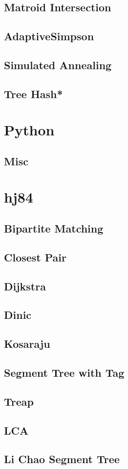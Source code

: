 \subsection{Matroid Intersection}

\subsection{AdaptiveSimpson}

\subsection{Simulated Annealing}

\subsection{Tree Hash*} %

\section{Python}
\subsection{Misc}

\section{hj84}
\subsection{Bipartite Matching}

\subsection{Closest Pair}

\subsection{Dijkstra}

\subsection{Dinic}

\subsection{Kosaraju}

\subsection{Segment Tree with Tag}

\subsection{Treap}

\subsection{LCA}

\subsection{Li Chao Segment Tree}

